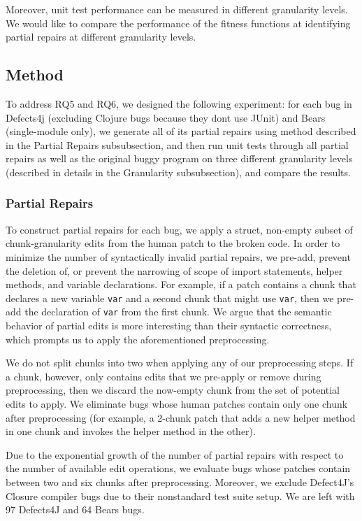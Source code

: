 \documentclass[sigconf, timestamp-false, anonymous=true]{acmart}
\begin{document}
Moreover, unit test performance can be measured in different granularity levels. 
We would like to compare the performance of the fitness functions at identifying 
partial repairs at different granularity levels.


\subsection{Method}

To address RQ5 and RQ6, we designed the following experiment: for each bug in 
Defects4j 
(excluding Clojure bugs because they dont use JUnit) 
and Bears (single-module only), we generate all of its partial repairs using method described in 
the Partial Repairs subsubsection, and then run unit tests through all partial repairs
as well as the original buggy program on three different granularity levels (described
in details in the Granularity subsubsection), and compare the results.

\subsubsection{Partial Repairs}

To construct partial repairs for each bug, we apply a struct, non-empty subset 
of chunk-granularity edits from the human patch to the broken code.
In order to minimize the number of syntactically invalid partial repairs, 
we pre-add, prevent the deletion of, or prevent the narrowing of scope of 
import statements, helper methods, and variable declarations.
For example, if a patch contains a chunk that declares a new variable 
\texttt{var} and a second chunk that might use \texttt{var}, then we 
pre-add the declaration of \texttt{var} from the first chunk. 
We argue that the semantic behavior of partial edits is more interesting 
than their syntactic correctness, which prompts us to apply the 
aforementioned preprocessing.

We do not split chunks into two when applying any of our preprocessing steps. 
If a chunk, however, only contains edits that we pre-apply or remove during 
preprocessing, then we discard the now-empty chunk from the set of 
potential edits to apply. We eliminate bugs whose human patches contain only 
one chunk after preprocessing (for example, a 2-chunk patch that adds a new 
helper method in one chunk and invokes the helper method in the other). 

Due to the exponential growth of the number of partial repairs with respect 
to the number of available edit operations, we evaluate bugs whose patches 
contain between two and six chunks after preprocessing.
Moreover, we exclude Defect4J's Closure compiler bugs due to 
their nonstandard test suite setup.
We are left with 97 Defects4J and 64 Bears bugs.
\end{document}
